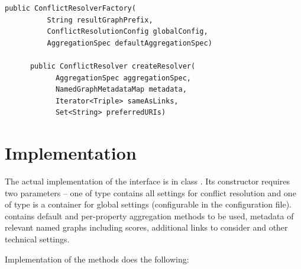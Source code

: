 \begin{lstlisting}[caption={\code{ConflictResolverFactory} interface},label=lst:crFactory]
      public ConflictResolverFactory(
          String resultGraphPrefix,
          ConflictResolutionConfig globalConfig,
          AggregationSpec defaultAggregationSpec)

      public ConflictResolver createResolver(
            AggregationSpec aggregationSpec,
            NamedGraphMetadataMap metadata,
            Iterator<Triple> sameAsLinks,
            Set<String> preferredURIs)
\end{lstlisting}

\section{Implementation}
The actual implementation of the  interface is in class . Its constructor requires two parameters -- one of type  contains all settings for conflict resolution and one of type  is a container for global settings (configurable in the \odcs configuration file).  contains default and per-property aggregation methods to be used, metadata of relevant named graphs including \QA scores, additional  links to consider and other technical settings.

Implementation of the  methods does the following:

